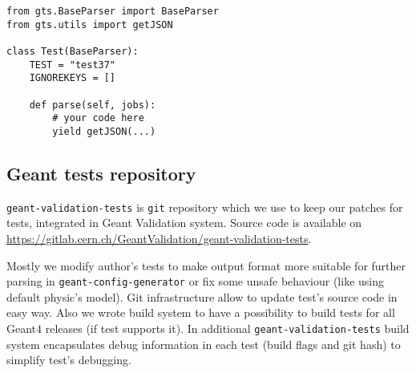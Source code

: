 \begin{verbatim}
from gts.BaseParser import BaseParser
from gts.utils import getJSON

class Test(BaseParser):
    TEST = "test37"
    IGNOREKEYS = []

    def parse(self, jobs):
        # your code here
        yield getJSON(...)
\end{verbatim}


\subsection{Geant tests repository}
\label{sec-geant-validation-tests}

{\tt geant-validation-tests} is {\tt git} repository which we use to keep our patches for tests, integrated in Geant Validation system. Source code is available on \url{https://gitlab.cern.ch/GeantValidation/geant-validation-tests}.

Mostly we modify author's tests to make output format more suitable for further parsing in {\tt geant-config-generator} or fix some unsafe behaviour (like using  default physic's model). Git infrastructure allow to update test's source code in easy way. Also we wrote build system to have a possibility to build tests for all Geant4 releases (if test supports it). In additional {\tt geant-validation-tests} build system encapsulates debug information in each test (build flags and git hash) to simplify test's debugging.
